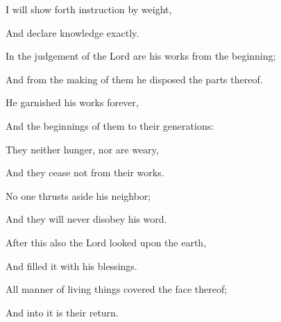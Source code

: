 {\par }{\Q {}I will show forth instruction by weight,
\par }{\Q And declare knowledge exactly.
\par }{\Q {}In the judgement of the Lord are his works from the beginning;
\par }{\Q And from the making of them he disposed the parts thereof.
\par }{\Q {}He garnished his works forever,
\par }{\Q And the beginnings of them to their generations:
\par }{\Q They neither hunger, nor are weary,
\par }{\Q And they cease not from their works.
\par }{\Q {}No one thrusts aside his neighbor;
\par }{\Q And they will never disobey his word.
\par }{\Q {}After this also the Lord looked upon the earth,
\par }{\Q And filled it with his blessings.
\par }{\Q {}
 All manner of living things covered the face thereof;
\par }{\Q And into it is their return.
\par }{\BB \par }
